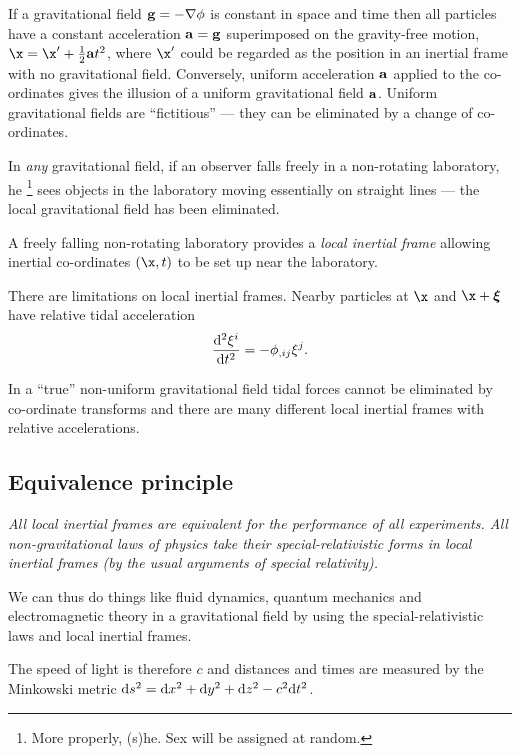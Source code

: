 \documentclass{notes}
\begin{document}
If a gravitational field $\mathbf{g} = - \nabla \phi$ is constant in
space and time then all particles have a constant acceleration
$\mathbf{a} = \mathbf{g}$ superimposed on the gravity-free motion, $\x =
\x' + \tfrac{1}{2} \vect{a} t^2$, where $\x'$ could be regarded as the
position in an inertial frame with no gravitational field.
Conversely, uniform acceleration $\mathbf{a}$ applied to the
co-ordinates gives the illusion of a uniform gravitational field
$\mathbf{a}$.  Uniform gravitational fields are ``fictitious'' --- they can
be eliminated by a change of co-ordinates.

In \emph{any} gravitational field, if an observer falls freely in
a non-rotating laboratory, he%
\footnote{More properly, (s)he.  Sex will be assigned at random.}
sees objects in the laboratory moving essentially on straight lines
--- the local gravitational field has been eliminated.

A freely falling non-rotating laboratory provides a \emph{local
  inertial frame} allowing inertial co-ordinates $(\x,t)$ to be set up
near the laboratory.

There are limitations on local inertial frames.  Nearby particles
at $\x$ and $\x + \boldsymbol{\xi}$ have relative tidal acceleration
\[
\frac{\mathrm{d}^2 \xi^i}{\mathrm{d} t^2} = - \phi_{,ij} \xi^j.
\]

In a ``true'' non-uniform gravitational field tidal forces cannot
be eliminated by co-ordinate transforms and there are many different local
inertial frames with relative accelerations.

\subsection{Equivalence principle}

\begin{center}
\parbox{4in}{\itshape
All local inertial frames are equivalent for the performance
of all experiments.  All non-gravitational laws of physics take
their special-relativistic forms in local inertial frames (by the
usual arguments of special relativity).
}
\end{center}

We can thus do things like fluid dynamics, quantum mechanics
and electromagnetic theory in a gravitational field by using the
special-relativistic laws and local inertial frames.

The speed of light is therefore $c$ and distances and times are
measured by the Minkowski metric $\mathrm{d} s^2 = \mathrm{d} x^2 + \mathrm{d} y^2 + \mathrm{d} z^2 -
c^2 \mathrm{d} t^2$.
\end{document}
